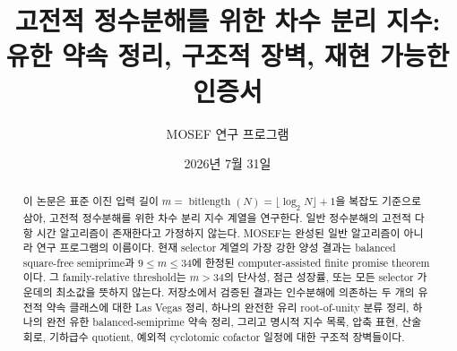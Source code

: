\documentclass[11pt]{article}
\title{고전적 정수분해를 위한 차수 분리 지수:\\
유한 약속 정리, 구조적 장벽, 재현 가능한 인증서}
\author{MOSEF 연구 프로그램}
\date{2026년 7월 31일}
\begin{document}
\maketitle

\begin{abstract}
이 논문은 표준 이진 입력 길이
\(m=\operatorname{bitlength}(N)=\lfloor\log_2N\rfloor+1\)을
복잡도 기준으로 삼아, 고전적 정수분해를
위한 차수 분리 지수 계열을 연구한다. 일반 정수분해의 고전적 다항
시간 알고리즘이 존재한다고 가정하지 않는다. MOSEF는 완성된 일반
알고리즘이 아니라 연구 프로그램의 이름이다. 현재 selector 계열의
가장 강한 양성 결과는 balanced square-free semiprime과
\(9\le m\le34\)에 한정된 computer-assisted finite promise theorem이다.
그 family-relative threshold는 \(m>34\)의 단사성, 점근 성장률, 또는
모든 selector 가운데의 최소값을 뜻하지 않는다. 저장소에서 검증된
결과는 인수분해에 의존하는 두 개의 유전적 약속 클래스에 대한
Las Vegas 정리, 하나의 완전한 유리 root-of-unity 분류 정리,
하나의 완전 유한 balanced-semiprime 약속 정리, 그리고
명시적 지수 목록, 압축 표현, 산술 회로, 기하급수 quotient, 예외적
cyclotomic cofactor 일정에 대한 구조적 장벽들이다.


\end{abstract}
\end{document}
